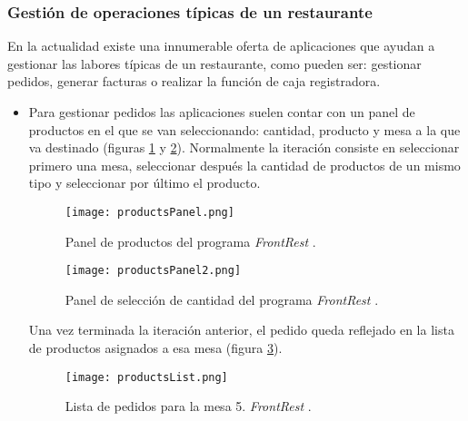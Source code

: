     \subsubsection{Gestión de operaciones típicas de un restaurante}
    En la actualidad existe una innumerable oferta de aplicaciones que ayudan
    a gestionar las labores típicas de un restaurante, como pueden ser:
    gestionar pedidos, generar facturas o realizar la función de caja 
    registradora.

    \begin{itemize}
    \item Para gestionar pedidos las aplicaciones suelen contar con un panel
    de productos en el que se van seleccionando: cantidad, producto y mesa
    a la que va destinado (figuras \ref{fig:productsPanel} y
    \ref{fig:productsPanel2}). Normalmente la iteración consiste en seleccionar
    primero una mesa, seleccionar después la cantidad de productos de un
    mismo tipo y seleccionar por último el producto.

    \begin{figure}[!h]
      \begin{center}
        \texttt{[image: productsPanel.png]}
        \caption{Panel de productos del programa \emph{FrontRest}
        \cite{bib:frontRest}.}
        \label{fig:productsPanel}
      \end{center}
    \end{figure}

    \begin{figure}[!h]
      \begin{center}
        \texttt{[image: productsPanel2.png]}
        \caption{Panel de selección de cantidad del programa \emph{FrontRest}
        \cite{bib:frontRest}.}
        \label{fig:productsPanel2}
      \end{center}
    \end{figure}

    Una vez terminada la iteración anterior, el pedido queda reflejado en la
    lista de productos asignados a esa mesa (figura \ref{fig:productsList}).

    \begin{figure}[!h]
      \begin{center}
        \texttt{[image: productsList.png]}
        \caption{Lista de pedidos para la mesa 5. \emph{FrontRest}
        \cite{bib:frontRest}.}
        \label{fig:productsList}
      \end{center}
    \end{figure}


\end{itemize}
